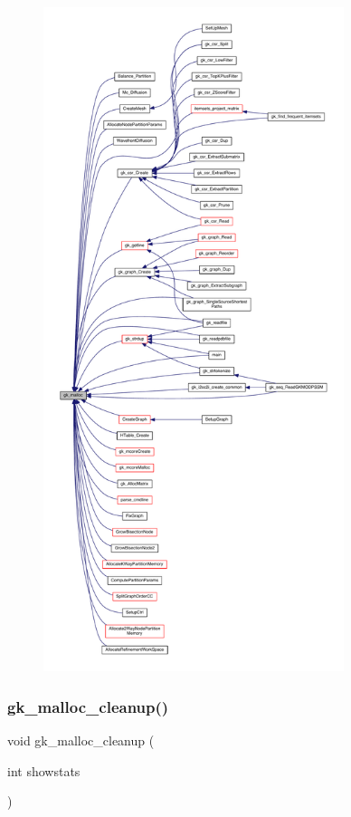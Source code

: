 \begin{figure}[H]
\begin{center}
\leavevmode
\includegraphics[height=550pt]{a00110_aba6f76f5c67b9b7e9c2e45988d3d3e9d_icgraph}
\end{center}
\end{figure}
\mbox{\label{a00110_a47156a22528b5bc8c7c6e9849af34e62}} 
\subsubsection{\texorpdfstring{gk\+\_\+malloc\+\_\+cleanup()}{gk\_malloc\_cleanup()}}
{\footnotesize\ttfamily void gk\+\_\+malloc\+\_\+cleanup (\begin{DoxyParamCaption}\item[{int}]{showstats }\end{DoxyParamCaption})}

